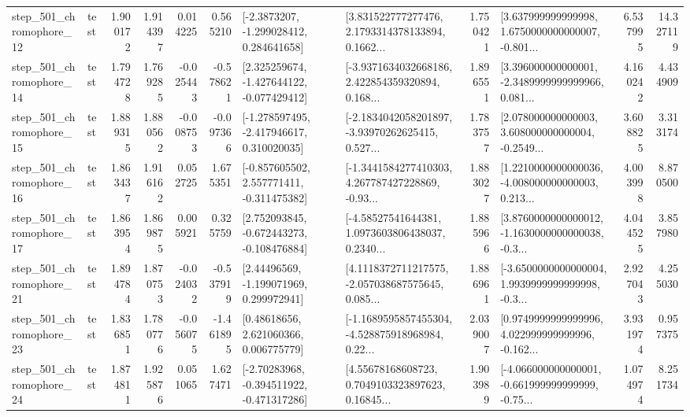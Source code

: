 \begin{tabular}{llrrrrllrlrr}
  step\_501\_chromophore\_12 &      test &      1.900172 &    1.914397 &      0.014225 &  0.565210 &     [-2.3873207, -1.299028412, 0.284641658] &  [3.831522777277476, 2.1793314378133894, 0.1662... &       1.750421 &  [3.637999999999998, 1.6750000000000007, -0.801... &            6.537995 &         14.327119 \\
  step\_501\_chromophore\_14 &      test &      1.794728 &    1.769285 &     -0.025443 & -0.578621 &   [2.325259674, -1.427644122, -0.077429412] &  [-3.9371634032668186, 2.422854359320894, 0.168... &       1.896551 &  [3.396000000000001, -2.3489999999999966, 0.081... &            4.160242 &          4.434909 \\
  step\_501\_chromophore\_15 &      test &      1.889315 &    1.880562 &     -0.008753 & -0.097366 &   [-1.278597495, -2.417946617, 0.310020035] &  [-2.1834042058201897, -3.93970262625415, 0.527... &       1.783757 &  [2.078000000000003, 3.608000000000004, -0.2549... &            3.608825 &          3.313174 \\
  step\_501\_chromophore\_16 &      test &      1.863437 &    1.916162 &      0.052725 &  1.675351 &   [-0.857605502, 2.557771411, -0.311475382] &  [-1.3441584277410303, 4.267787427228869, -0.93... &       1.883027 &  [1.2210000000000036, -4.008000000000003, 0.213... &            4.003998 &          8.870500 \\
  step\_501\_chromophore\_17 &      test &      1.863954 &    1.869875 &      0.005921 &  0.325759 &   [2.752093845, -0.672443273, -0.108476884] &  [-4.58527541644381, 1.0973603806438037, 0.2340... &       1.885966 &  [3.8760000000000012, -1.1630000000000038, -0.3... &            4.044525 &          3.857980 \\
  step\_501\_chromophore\_21 &      test &      1.894784 &    1.870753 &     -0.024032 & -0.537919 &     [2.44496569, -1.199071969, 0.299972941] &  [4.1118372711217575, -2.057038687575645, 0.085... &       1.886961 &  [-3.6500000000000004, 1.9939999999999998, -0.3... &            2.927043 &          4.255030 \\
  step\_501\_chromophore\_23 &      test &      1.836851 &    1.780776 &     -0.056075 & -1.461895 &      [0.48618656, 2.621060366, 0.006775779] &  [-1.1689595857455304, -4.528875918968984, 0.22... &       2.039007 &  [0.9749999999999996, 4.022999999999996, -0.162... &            3.931974 &          0.957375 \\
  step\_501\_chromophore\_24 &      test &      1.874811 &    1.925876 &      0.051065 &  1.627471 &   [-2.70283968, -0.394511922, -0.471317286] &  [4.55678168608723, 0.7049103323897623, 0.16845... &       1.903989 &  [-4.066000000000001, -0.661999999999999, -0.75... &            1.074974 &          8.251734 \\

\end{tabular}
